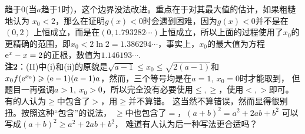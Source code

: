 \begin{enumerate}[label={【\textbf{例\thechapter.\arabic*}】},
 leftmargin=\inteval{\myenumleftmargin}pt,
 itemsep=\inteval{\myenumitempsep}pt,
 itemindent=\inteval{\myenumitemindent}pt]
趋于0(当$ a $趋于1时)，这个边界没法改进。重点在于对其最大值的估计，如果粗糙地认为
$ x_0<2 $，那么在证明$ g(x)<0 $时会遇到困难，因为$ g(x)<0 $并不是在$ (0,2) $
上恒成立，而是在$ (0,1.793282\cdots) $上恒成立，所以上面的过程使用了$ x_0 $的更精确的范围，即$ x_0<2\ln2=1.386294\cdots $，事实上，$ x_0 $的最大值为方程$ \mathrm{e}^x-x=2 $的正根，数值为$ 1.146193\cdots $.\\
\textbf{注2}：(II)中(i)和(ii)的原貌是$ \sqrt{a-1}\leq x_0 \leq \sqrt{2(a-1)} $和
$ x_0f(\mathrm{e}^{x_0})\geqslant (\mathrm{e}-1)(a-1)a $，然而，三个等号均是在$ a=1,\ x_0=0 $时才能取到，
但题目一再强调$ a>1,\ x_0>0 $，所以完全没有必要使用$ \leq,\geq $，使用$ <,> $即可。
有的人认为$ \geq $中包含了$ > $，用$ \geq $并不算错。
这当然不算错误，然而显得很别扭。按照这种“包含”的说法，
$ \geq $中也包含了$ = $，$ (a+b)^2=a^2+2ab+b^2 $
可以写成$ (a+b)^2\geq a^2+2ab+b^2 $，
难道有人认为后一种写法更合适吗？


\end{enumerate}

